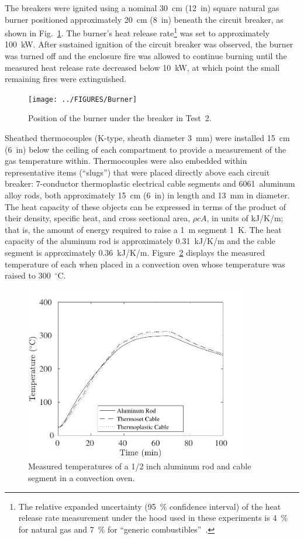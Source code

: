 \documentclass[12pt]{article}
\begin{document}
The breakers were ignited using a nominal 30~cm (12~in) square natural gas burner positioned approximately 20~cm (8~in) beneath the circuit breaker, as shown in Fig.~\ref{fig:Burner}. The burner's heat release rate\footnote{The relative expanded uncertainty (95~\% confidence interval) of the heat release rate measurement under the hood used in these experiments is 4~\% for natural gas and 7~\% for ``generic combustibles''~\cite{bryant2019nist}.} was set to approximately 100~kW. After sustained ignition of the circuit breaker was observed, the burner was turned off and the enclosure fire was allowed to continue burning until the measured heat release rate decreased below 10~kW, at which point the small remaining fires were extinguished.

\begin{figure}[ht]
\centering
\texttt{[image: ../FIGURES/Burner]}
\caption[Position of the burner] {Position of the burner under the breaker in Test~2.}
\label{fig:Burner}
\end{figure}

Sheathed thermocouples (K-type, sheath diameter 3~mm) were installed 15~cm (6~in) below the ceiling of each compartment to provide a measurement of the gas temperature within. Thermocouples were also embedded within representative items (``slugs'') that were placed directly above each circuit breaker: 7-conductor thermoplastic electrical cable segments and 6061~aluminum alloy rods, both approximately  15~cm (6~in) in length and 13~mm in diameter. The heat capacity of these objects can be expressed in terms of the product of their density, specific heat, and cross sectional area, $\rho c A$, in units of kJ/K/m; that is, the amount of energy required to raise a 1~m segment 1~K. The heat capacity of the aluminum rod is approximately 0.31~kJ/K/m and the cable segment is approximately 0.36~kJ/K/m. Figure~\ref{oven} displays the measured temperature of each when placed in a convection oven whose temperature was raised to 300~$^\circ$C.

\begin{figure}[!ht]
\centering
\includegraphics[height=3.0in]{../SCRIPT_FIGURES/Oven_Test}
\caption[Measured temperatures of slug calorimeters in a convection oven]{Measured temperatures of a 1/2 inch aluminum rod and cable segment in a convection oven.}
\label{oven}
\end{figure}
\end{document}

